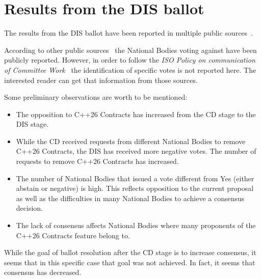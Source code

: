 \section{Results from the DIS ballot}

The results from the DIS ballot have been reported in multiple public
sources~\cite{seacord:linkedin,ballot:trainit}.

According to other public sources~\cite{kowalska:lavx,ballot:hn,ballot:trainit}
the National Bodies voting against have been publicly reported. However, in
order to follow the \emph{ISO Policy on communication of Committee
Work}~\cite{iso:comm:policy} the identification of specific votes is not
reported here. The interested reader can get that information from those
sources.

Some preliminary observations are worth to be mentioned:

\begin{itemize}
  \item The opposition to C++26 Contracts has increased from the CD stage to the DIS
stage.

  \item While the CD received requests from different National Bodies to
remove C++26 Contracts, the DIS has received more negative votes. The number of requests
to remove C++26 Contracts has increased.

  \item The number of National Bodies that issued a vote different from Yes
(either abstain or negative) is high. This reflects opposition to the
current proposal as well as the difficulties in many National Bodies to achieve a
consensus decision.

  \item The lack of consensus affects National Bodies where many proponents of
the C++26 Contracts feature belong to.

\end{itemize}

While the goal of ballot resolution after the CD stage is to increase consensus,
it seems that in this specific case that goal was not achieved. In fact, it
seems that consensus has decreased.
